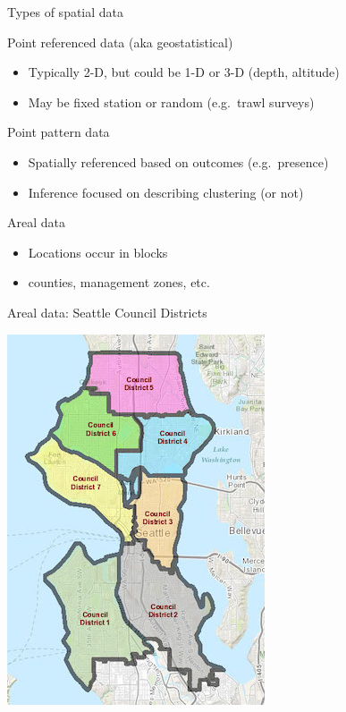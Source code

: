 \documentclass[
  ignorenonframetext,
]{beamer}
\providecommand{\tightlist}{%
  \setlength{\itemsep}{0pt}\setlength{\parskip}{0pt}}
\begin{document}
\begin{frame}{Types of spatial data}
\protect\hypertarget{types-of-spatial-data}{}

Point referenced data (aka geostatistical)

\begin{itemize}
\tightlist
\item
  Typically 2-D, but could be 1-D or 3-D (depth, altitude)
\item
  May be fixed station or random (e.g.~trawl surveys)
\end{itemize}

Point pattern data

\begin{itemize}
\tightlist
\item
  Spatially referenced based on outcomes (e.g.~presence)
\item
  Inference focused on describing clustering (or not)
\end{itemize}

Areal data

\begin{itemize}
\tightlist
\item
  Locations occur in blocks
\item
  counties, management zones, etc.
\end{itemize}

\end{frame}

\begin{frame}{Areal data: Seattle Council Districts}
\protect\hypertarget{areal-data-seattle-council-districts}{}

\includegraphics{DistrictsMap.jpeg}

\end{frame}
\end{document}
